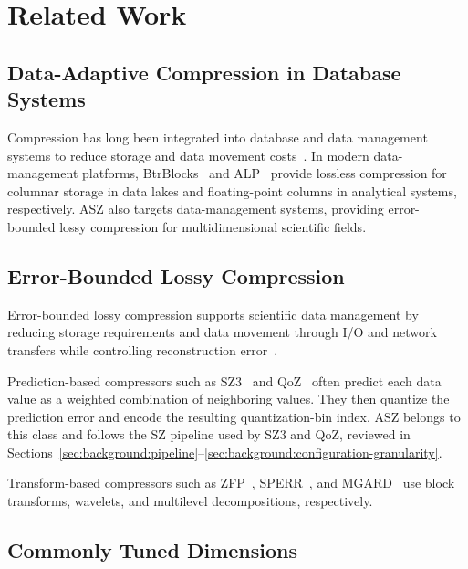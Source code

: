 \section{Related Work}
\label{sec:related-work}

\subsection{Data-Adaptive Compression in Database Systems}
\label{sec:related-work:database}

Compression has long been integrated into database and data management systems to reduce storage and data movement costs~\cite{li1987compression}. In modern data-management platforms, BtrBlocks~\cite{kuschewski2023btrblocks} and ALP~\cite{afroozeh2023alp} provide lossless compression for columnar storage in data lakes and floating-point columns in analytical systems, respectively. ASZ also targets data-management systems, providing error-bounded lossy compression for multidimensional scientific fields.

\subsection{Error-Bounded Lossy Compression}
\label{sec:related-work:compression}

Error-bounded lossy compression supports scientific data management by reducing storage requirements and data movement through I/O and network transfers while controlling reconstruction error~\cite{cappello2019use,di2025survey}.

Prediction-based compressors such as SZ3~\cite{zhao2021optimizing,liang2022sz3} and QoZ~\cite{liu2022dynamic,liu2024high} often predict each data value as a weighted combination of neighboring values. They then quantize the prediction error and encode the resulting quantization-bin index. ASZ belongs to this class and follows the SZ pipeline used by SZ3 and QoZ, reviewed in Sections~\ref{sec:background:pipeline}--\ref{sec:background:configuration-granularity}.

Transform-based compressors such as ZFP~\cite{lindstrom2014fixed}, SPERR~\cite{li2023lossy}, and MGARD~\cite{gong2023mgard} use block transforms, wavelets, and multilevel decompositions, respectively.

\subsection{Commonly Tuned Dimensions}
\label{sec:related-work:dimensions}

